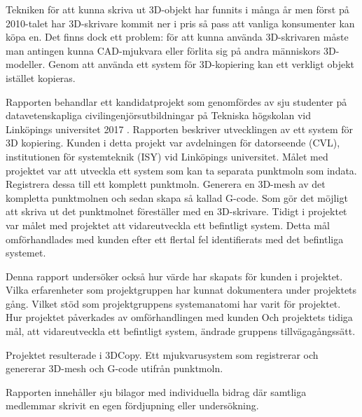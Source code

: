 Tekniken för att kunna skriva ut 3D-objekt har funnits i många år men först på 2010-talet har 3D-skrivare kommit ner i pris så pass att vanliga konsumenter kan köpa en.  Det finns dock ett problem: för att kunna använda 3D-skrivaren måste man antingen kunna CAD-mjukvara eller förlita sig på andra människors 3D-modeller. Genom att använda ett system för 3D-kopiering kan ett verkligt objekt istället kopieras.

Rapporten behandlar ett kandidatprojekt som genomfördes av sju studenter på datavetenskapliga civilingenjörsutbildningar på Tekniska högskolan vid Linköpings universitet 2017 . Rapporten beskriver utvecklingen av ett system för 3D kopiering. Kunden i detta projekt var avdelningen för datorseende (CVL), institutionen för systemteknik (ISY) vid Linköpings universitet. Målet med projektet var att utveckla ett system som kan ta separata punktmoln som indata. Registrera dessa till ett komplett punktmoln. Generera en 3D-mesh av det kompletta punktmolnen och sedan skapa så kallad G-code. Som gör det möjligt att skriva ut det punktmolnet föreställer med en 3D-skrivare. Tidigt i projektet var målet med projektet att vidareutveckla ett befintligt system. Detta mål omförhandlades med kunden efter ett flertal fel identifierats med det befintliga systemet. 

Denna rapport undersöker också hur värde har skapats för kunden i projektet. Vilka erfarenheter som projektgruppen har kunnat dokumentera under projektets gång. Vilket stöd som projektgruppens systemanatomi har varit för projektet. Hur projektet påverkades av omförhandlingen med kunden Och projektets tidiga mål, att vidareutveckla ett befintligt system, ändrade gruppens tillvägagångssätt.  

Projektet resulterade i 3DCopy. Ett mjukvarusystem som registrerar och genererar 3D-mesh och G-code utifrån punktmoln.  

Rapporten innehåller sju bilagor med individuella bidrag där samtliga medlemmar skrivit en egen fördjupning eller undersökning. 

